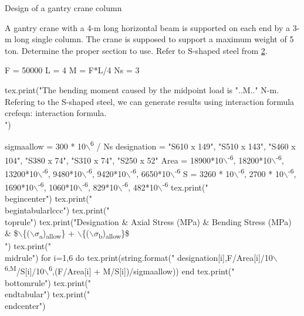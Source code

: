 \documentclass[a4paper,openany,12pt]{book}
\begin{document}
{{\begin{enumerate}
Design of a gantry crane column

A gantry crane with a 4-m long horizontal beam is supported on each end
by a 3-m long single column. The crane is supposed to support a maximum
weight of 5 ton. Determine the proper section to use. Refer to S-shaped
steel from \hyperref[appendix: structural steel properties]{2}.

F = 50000 L = 4 M = F*L/4 Ns = 3

tex.print("The bending moment caused by the midpoint load is "..M.."
N-m. Refering to the S-shaped steel, we can generate results using
interaction formula\\
crefeqn: interaction formula.\\

")

sigmaallow = 300 * 10$\backslash$\textsuperscript{6} / Ns designation = "S610 x 149", "S510 x 143",
"S460 x 104", "S380 x 74", "S310 x 74", "S250 x 52" Area = 18900*10$\backslash$\textsuperscript{-6},
18200*10$\backslash$\textsuperscript{-6}, 13200*10$\backslash$\textsuperscript{-6}, 9480*10$\backslash$\textsuperscript{-6}, 9420*10$\backslash$\textsuperscript{-6}, 6650*10$\backslash$\textsuperscript{-6} S =
3260 * 10$\backslash$\textsuperscript{-6}, 2700 * 10$\backslash$\textsuperscript{-6}, 1690*10$\backslash$\textsuperscript{-6}, 1060*10$\backslash$\textsuperscript{-6}, 829*10$\backslash$\textsuperscript{-6},
482*10$\backslash$\textsuperscript{-6} tex.print("\\
begincenter") tex.print("\\
begintabularlccc") tex.print("\\
toprule") tex.print("Designation \& Axial Stress (MPa) \& Bending Stress
(MPa) \&
\$$\backslash$\{($\backslash$\(\sigma\)\textsubscript{a})\textsubscript{allow}\} + $\backslash$\{($\backslash$\(\sigma\)\textsubscript{b})\textsubscript{allow}\}\$\\

") tex.print("\\
midrule") for i=1,6 do tex.print(string.format("
designation[i],F/Area[i]/10$\backslash$\textsuperscript{6,M}/S[i]/10$\backslash$\textsuperscript{6},(F/Area[i] +
M/S[i])/sigmaallow)) end tex.print("\\
bottomrule") tex.print("\\
endtabular") tex.print("\\
endcenter")


\end{enumerate}}}
\end{document}
